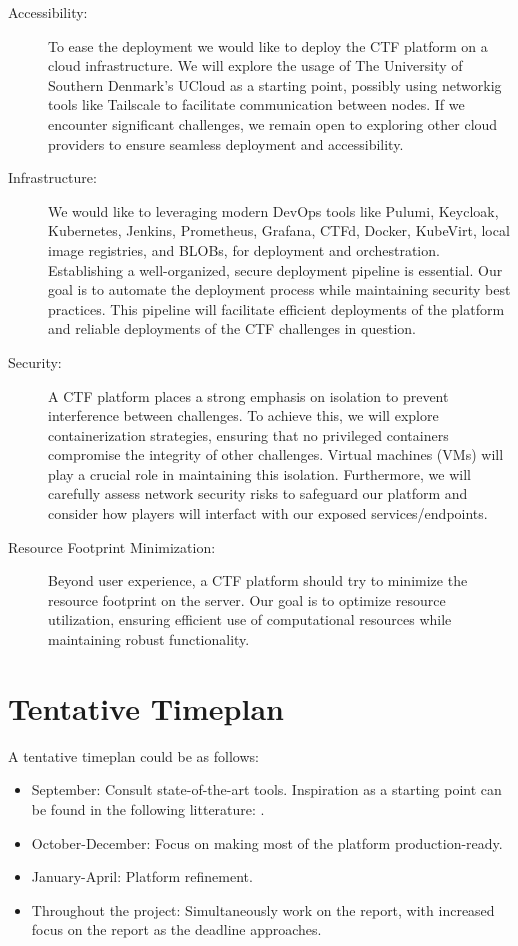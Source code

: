 \documentclass[11pt]{article}
\begin{document}
\begin{description}
    \item[Accessibility:] To ease the deployment we would like to deploy the CTF platform on a cloud infrastructure. We will explore the usage of The University of Southern Denmark's UCloud\cite{ucloud} as a starting point, possibly using networkig tools like Tailscale to facilitate communication between nodes. If we encounter significant challenges, we remain open to exploring other cloud providers to ensure seamless deployment and accessibility.
    \item[Infrastructure:] We would like to leveraging modern DevOps tools like Pulumi\cite{pulumi}, Keycloak\cite{keycloak}, Kubernetes\cite{kubernetes}, Jenkins\cite{jenkins}, Prometheus\cite{prometheus}, Grafana\cite{grafana}, CTFd\cite{ctfd}, Docker\cite{docker}, KubeVirt\cite{kubevirt}, local image registries, and BLOBs, for deployment and orchestration. Establishing a well-organized, secure deployment pipeline is essential. Our goal is to automate the deployment process while maintaining security best practices. This pipeline will facilitate efficient deployments of the platform and reliable deployments of the CTF challenges in question.
    \item[Security:] A CTF platform places a strong emphasis on isolation to prevent interference between challenges. To achieve this, we will explore containerization strategies, ensuring that no privileged containers compromise the integrity of other challenges. Virtual machines (VMs) will play a crucial role in maintaining this isolation. Furthermore, we will carefully assess network security risks to safeguard our platform and consider how players will interfact with our exposed services/endpoints.
    \item[Resource Footprint Minimization:] Beyond user experience, a CTF platform should try to minimize the resource footprint on the server. Our goal is to optimize resource utilization, ensuring efficient use of computational resources while maintaining robust functionality.
\end{description}

\section*{Tentative Timeplan}
A tentative timeplan could be as follows:

\begin{itemize}
    \item September: Consult state-of-the-art tools. Inspiration as a starting point can be found in the following litterature: \cite{Handbook,Phoenix,delivery}.
    \item October-December: Focus on making most of the platform production-ready.
    \item January-April: Platform refinement.
    \item Throughout the project: Simultaneously work on the report, with increased focus on the report as the deadline approaches.
\end{itemize}
\end{document}
